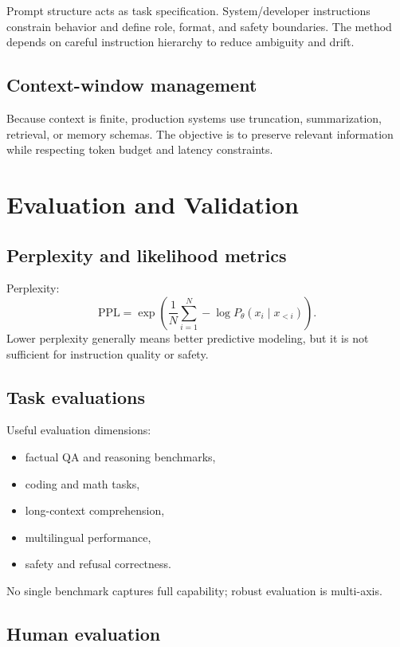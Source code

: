 \documentclass[12pt]{article}
\begin{document}
Prompt structure acts as task specification. System/developer instructions constrain behavior and define role, format, and safety boundaries. The method depends on careful instruction hierarchy to reduce ambiguity and drift.

\subsection{Context-window management}

Because context is finite, production systems use truncation, summarization, retrieval, or memory schemas. The objective is to preserve relevant information while respecting token budget and latency constraints.

\section{Evaluation and Validation}

\subsection{Perplexity and likelihood metrics}

Perplexity:
\[
\text{PPL} = \exp\!\left(\frac{1}{N}\sum_{i=1}^{N} -\log P_\theta(x_i\mid x_{<i})\right).
\]
Lower perplexity generally means better predictive modeling, but it is not sufficient for instruction quality or safety.

\subsection{Task evaluations}

Useful evaluation dimensions:
\begin{itemize}
    \item factual QA and reasoning benchmarks,
    \item coding and math tasks,
    \item long-context comprehension,
    \item multilingual performance,
    \item safety and refusal correctness.
\end{itemize}
No single benchmark captures full capability; robust evaluation is multi-axis.

\subsection{Human evaluation}
\end{document}
